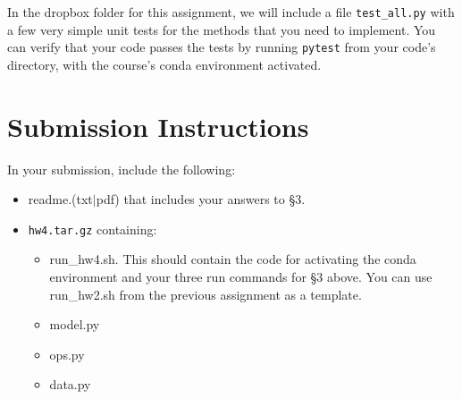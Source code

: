 \documentclass[11pt]{article}
\begin{document}
In the dropbox folder for this assignment, we will include a file \texttt{test\_all.py} with a few very simple unit tests for the methods that you need to implement.  You can verify that your code passes the tests by running \texttt{pytest} from your code's directory, with the course's conda environment activated.


\section*{Submission Instructions}

In your submission, include the following:
\begin{itemize}
  \item readme.(txt$\mid$pdf) that includes your answers to \S3. 
  \item \texttt{hw4.tar.gz} containing:
  \begin{itemize}
    \item run\_hw4.sh.  This should contain the code for activating the conda environment and your three run commands for \S3 above.  You can use run\_hw2.sh from the previous assignment as a template.
    \item model.py
    \item ops.py
    \item data.py
  \end{itemize}
\end{itemize}
\end{document}
